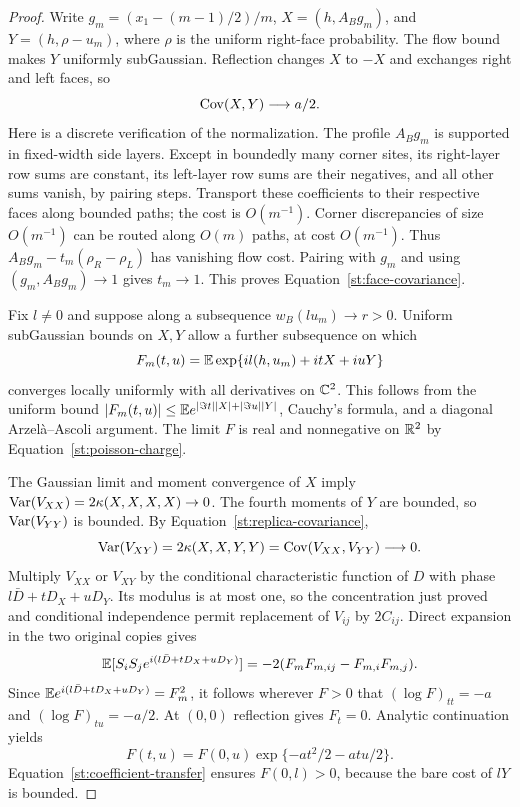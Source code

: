 \begin{proof}
Write $g_m=(x_1-(m-1)/2)/m$, $X=(h,A_Bg_m)$, and
$Y=(h,\rho-u_m)$, where $\rho$ is the uniform right-face probability.
The flow bound makes $Y$ uniformly subGaussian. Reflection changes $X$
to $-X$ and exchanges right and left faces, so
\begin{equation}\label{st:face-covariance}
 \operatorname{Cov}(X,Y)\longrightarrow a/2.
\end{equation}
Here is a discrete verification of the normalization. The profile
$A_Bg_m$ is supported in fixed-width side layers. Except in boundedly many
corner sites, its right-layer row sums are constant, its left-layer row
sums are their negatives, and all other sums vanish, by pairing steps.
Transport these coefficients to their respective faces along bounded
paths; the cost is $O(m^{-1})$. Corner discrepancies of size $O(m^{-1})$
can be routed along $O(m)$ paths, at cost $O(m^{-1})$. Thus
$A_Bg_m-t_m(\rho_R-\rho_L)$ has vanishing flow cost. Pairing with $g_m$
and using $(g_m,A_Bg_m)\to1$ gives $t_m\to1$. This proves
Equation~\eqref{st:face-covariance}.

Fix $l\ne0$ and suppose along a subsequence
$w_B(lu_m)\to r>0$. Uniform subGaussian bounds on $X,Y$ allow a further
subsequence on which
\[
 F_m(t,u)=\mathbb E\exp\{il(h,u_m)+itX+iuY\}
\]
converges locally uniformly with all derivatives on $\mathbb C^2$.
This follows from the uniform bound
$|F_m(t,u)|\le\mathbb E e^{|\Im t||X|+|\Im u||Y|}$, Cauchy's formula, and a
diagonal Arzel\`a--Ascoli argument. The limit $F$ is real and nonnegative
on $\mathbb R^2$ by Equation~\eqref{st:poisson-charge}.

The Gaussian limit and moment convergence of $X$ imply
$\operatorname{Var}(V_{XX})=2\kappa(X,X,X,X)\to0$. The fourth moments of $Y$ are bounded,
so $\operatorname{Var}(V_{YY})$ is bounded. By Equation~\eqref{st:replica-covariance},
\[
 \operatorname{Var}(V_{XY})=2\kappa(X,X,Y,Y)
            =\operatorname{Cov}(V_{XX},V_{YY})\longrightarrow0.
\]
Multiply $V_{XX}$ or $V_{XY}$ by the conditional characteristic function
of $D$ with phase $l\bar D+tD_X+uD_Y$. Its modulus is at most one, so the
concentration just proved and conditional independence permit replacement
of $V_{ij}$ by $2C_{ij}$. Direct expansion in the two original copies gives
\[
 \mathbb E[S_iS_j e^{i(l\bar D+tD_X+uD_Y)}]
       =-2(F_m F_{m,ij}-F_{m,i}F_{m,j}).
\]
Since $\mathbb E e^{i(l\bar D+tD_X+uD_Y)}=F_m^2$, it follows wherever $F>0$ that
$(\log F)_{tt}=-a$ and $(\log F)_{tu}=-a/2$.
At $(0,0)$ reflection gives $F_t=0$. Analytic continuation yields
\begin{equation}\label{st:phase-transform}
 F(t,u)=F(0,u)\exp\{-at^2/2-atu/2\}.
\end{equation}
Equation~\eqref{st:coefficient-transfer} ensures $F(0,l)>0$, because the
bare cost of $lY$ is bounded.


\end{proof}
